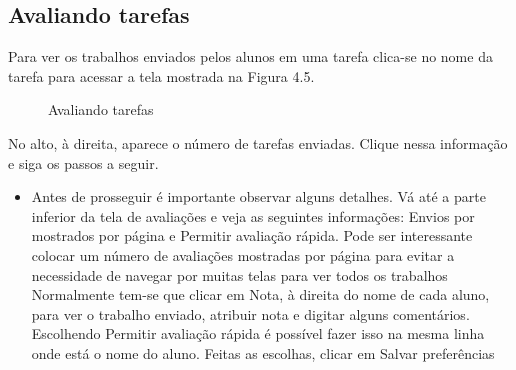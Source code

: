 \subsection{Avaliando tarefas}

Para ver os trabalhos enviados pelos alunos em uma tarefa clica-se no nome da tarefa para acessar a tela mostrada na Figura 4.5.

\begin{figure}
 \begin{center}
  \caption{Avaliando tarefas}
 \end{center}
\end{figure}

No alto, à direita, aparece o número de tarefas enviadas. Clique nessa informação e siga os passos a seguir.

\begin{itemize}
 \item Antes de prosseguir é importante observar alguns detalhes. Vá até a parte inferior da tela de avaliações e veja as seguintes informações: Envios por mostrados por página e Permitir avaliação rápida.
\subitem Pode ser interessante colocar um número de avaliações mostradas por página para evitar a necessidade de navegar por muitas telas para ver todos os trabalhos
\subitem Normalmente tem-se que clicar em Nota, à direita do nome de cada aluno, para ver o trabalho enviado, atribuir nota e digitar alguns comentários. Escolhendo Permitir avaliação rápida é possível fazer isso na mesma linha onde está o nome do aluno.
\subitem Feitas as escolhas, clicar em Salvar preferências
\end{itemize}




